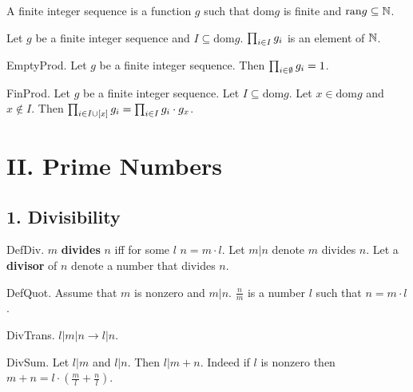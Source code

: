 \begin{definitionp}
A finite integer sequence is a function $g$ such that
$\text{dom} g$ is finite and
$\text{ran} g \subseteq \NN$.
\end{definitionp}

\begin{signaturep}
Let $g$ be a finite integer sequence and $I \subseteq \text{dom} g$.
$\Pro{g}{I}$ is an element of $\NN$.
\end{signaturep}

\begin{axiom} EmptyProd.
Let $g$ be a finite integer sequence.
Then $\Pro{g}{\emptyset} = 1$.
\end{axiom}

\begin{axiom} FinProd.
Let $g$ be a finite integer sequence. Let $I \subseteq \text{dom} g$.
Let $x \in \text{dom} g$ and $x \notin I$.
Then $\Pro{g}{I \cup [x]} = \Pro{g}{I} \cdot \subfunc{g}{x}$.
\end{axiom}



\section{II. Prime Numbers}

\subsection{1. Divisibility}


\begin{definition} DefDiv.
$m$ {\bf divides} $n$ iff for some $l$ $n = m \cdot l$.
Let $m | n$ denote $m$ divides $n$.
Let a {\bf divisor} of $n$ denote a number that divides $n$.
\end{definition}

\begin{definition} DefQuot.
Assume that $m$ is nonzero and $m | n$.
$\frac{n}{m}$ is a number $l$ such that $n = m \cdot l$.
\end{definition}

\begin{lemma} DivTrans. $l | m | n \rightarrow l | n$.
\end{lemma}

\begin{lemma} DivSum.
Let $l | m$ and $l | n$. Then $l | m + n$.
Indeed if $l$ is nonzero then 
$m + n = l \cdot (\frac{m}{l} + \frac{n}{l})$.
\end{lemma}

